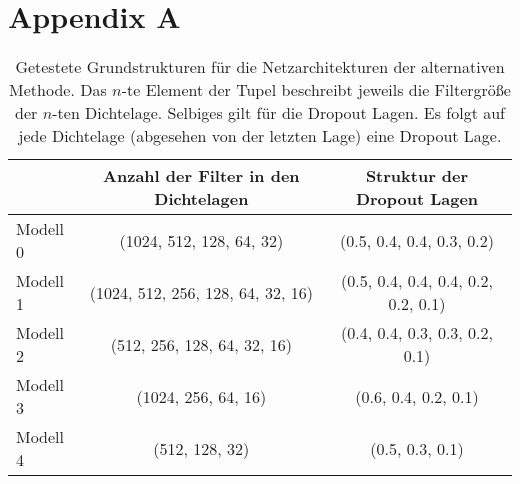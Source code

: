 \chapter{Appendix A}

\begin{table}
  \centering%
  \begin{tabular}{l
                  c
                  c}
      \toprule
      {}    & Anzahl der Filter in den Dichtelagen  & Struktur der Dropout Lagen      \\
      \midrule
      Modell 0    & (1024, 512, 128, 64, 32)  & (0.5, 0.4, 0.4, 0.3, 0.2) \\
      Modell 1    & (1024, 512, 256, 128, 64, 32, 16)  & (0.5, 0.4, 0.4, 0.4, 0.2, 0.2, 0.1) \\
      Modell 2    & (512, 256, 128, 64, 32, 16)  & (0.4, 0.4, 0.3, 0.3, 0.2, 0.1) \\
      Modell 3    & (1024, 256, 64, 16)  & (0.6, 0.4, 0.2, 0.1) \\
      Modell 4    & (512, 128, 32)  & (0.5, 0.3, 0.1) \\
      \bottomrule
  \end{tabular}
  \caption{Getestete Grundstrukturen für die Netzarchitekturen der alternativen Methode. Das $n$-te Element der Tupel beschreibt jeweils die Filtergröße der $n$-ten Dichtelage. Selbiges gilt für die Dropout Lagen. Es folgt auf jede Dichtelage (abgesehen von der letzten Lage) eine Dropout Lage.}
  \label{tab:grid}
\end{table}
%

